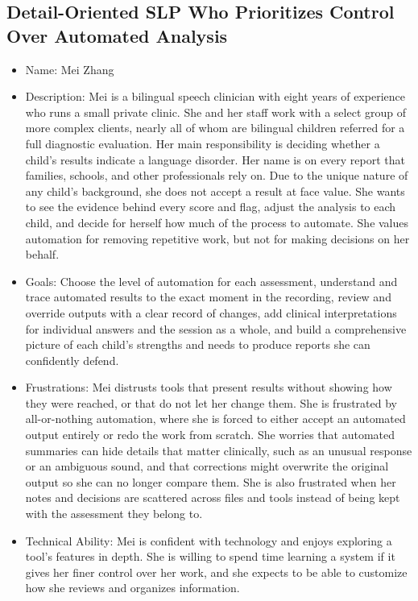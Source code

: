 \documentclass[12pt]{article}
\begin{document}
\subsection{Detail-Oriented SLP Who Prioritizes Control Over Automated Analysis}
\begin{itemize}
\item Name: Mei Zhang
\item Description: Mei is a bilingual speech clinician with eight years of experience who runs a small private clinic. She and her staff work with a select group of more complex clients, nearly all of whom are bilingual children referred for a full diagnostic evaluation. Her main responsibility is deciding whether a child’s results indicate a language disorder. Her name is on every report that families, schools, and other professionals rely on. Due to the unique nature of any child's background, she does not accept a result at face value. She wants to see the evidence behind every score and flag, adjust the analysis to each child, and decide for herself how much of the process to automate. She values automation for removing repetitive work, but not for making decisions on her behalf.
\item Goals: Choose the level of automation for each assessment, understand and trace automated results to the exact moment in the recording, review and override outputs with a clear record of changes, add clinical interpretations for individual answers and the session as a whole, and build a comprehensive picture of each child’s strengths and needs to produce reports she can confidently defend.
\item Frustrations: Mei distrusts tools that present results without showing how they were reached, or that do not let her change them. She is frustrated by all-or-nothing automation, where she is forced to either accept an automated output entirely or redo the work from scratch. She worries that automated summaries can hide details that matter clinically, such as an unusual response or an ambiguous sound, and that corrections might overwrite the original output so she can no longer compare them. She is also frustrated when her notes and decisions are scattered across files and tools instead of being kept with the assessment they belong to.
\item Technical Ability: Mei is confident with technology and enjoys exploring a tool’s features in depth. She is willing to spend time learning a system if it gives her finer control over her work, and she expects to be able to customize how she reviews and organizes information. 
\end{itemize}
\end{document}
